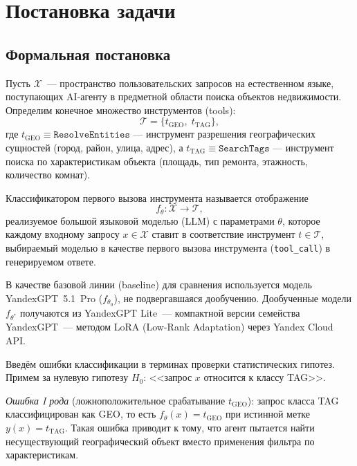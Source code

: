 
\section{Постановка задачи} \label{sec:task}

\subsection{Формальная постановка}

Пусть $\mathcal{X}$~--- пространство пользовательских запросов на естественном языке, поступающих AI-агенту в предметной области поиска объектов недвижимости. Определим конечное множество инструментов (tools):
\[
    \mathcal{T} = \{t_{\mathrm{GEO}},\; t_{\mathrm{TAG}}\},
\]
где $t_{\mathrm{GEO}} \equiv \texttt{ResolveEntities}$ --- инструмент разрешения географических сущностей (город, район, улица, адрес), а $t_{\mathrm{TAG}} \equiv \texttt{SearchTags}$ --- инструмент поиска по характеристикам объекта (площадь, тип ремонта, этажность, количество комнат).

\begin{definition}
Классификатором первого вызова инструмента называется отображение
\[
    f_\theta \colon \mathcal{X} \to \mathcal{T},
\]
реализуемое большой языковой моделью (LLM) с параметрами $\theta$, которое каждому входному запросу $x \in \mathcal{X}$ ставит в соответствие инструмент $t \in \mathcal{T}$, выбираемый моделью в качестве первого вызова инструмента (\texttt{tool\_call}) в генерируемом ответе.
\end{definition}

В качестве базовой линии (baseline) для сравнения используется модель YandexGPT~5.1~Pro ($f_{\theta_0}$), не подвергавшаяся дообучению. Дообученные модели $f_{\theta^*}$ получаются из YandexGPT Lite~--- компактной версии семейства YandexGPT~--- методом LoRA (Low-Rank Adaptation) через Yandex Cloud API.

Введём ошибки классификации в терминах проверки статистических гипотез. Примем за нулевую гипотезу $H_0$: <<запрос $x$ относится к классу TAG>>.

\begin{definition}
\emph{Ошибка I рода} (ложноположительное срабатывание $t_{\mathrm{GEO}}$): запрос класса TAG классифицирован как GEO, то есть $f_\theta(x) = t_{\mathrm{GEO}}$ при истинной метке $y(x) = t_{\mathrm{TAG}}$. Такая ошибка приводит к тому, что агент пытается найти несуществующий географический объект вместо применения фильтра по характеристикам.
\end{definition}


